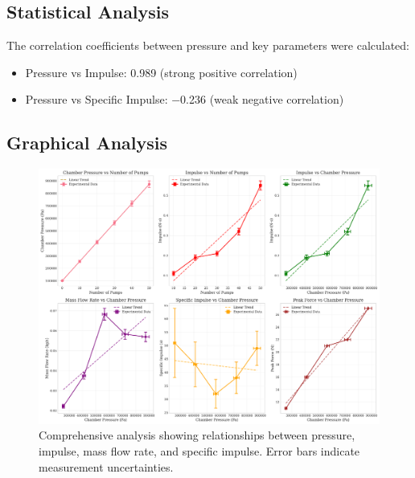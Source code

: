 \documentclass[12pt,a4paper]{article}
\begin{document}
\subsection{Statistical Analysis}
The correlation coefficients between pressure and key parameters were calculated:
\begin{itemize}
    \item Pressure vs Impulse: \SI{0.989}{} (strong positive correlation)
    \item Pressure vs Specific Impulse: \SI{-0.236}{} (weak negative correlation)
\end{itemize}

\subsection{Graphical Analysis}

\begin{figure}[H]
\centering
\includegraphics[width=\textwidth]{physics_ia_comprehensive_analysis}
\caption{Comprehensive analysis showing relationships between pressure, impulse, mass flow rate, and specific impulse. Error bars indicate measurement uncertainties.}
\label{fig:comprehensive_new}
\end{figure}
\end{document}
